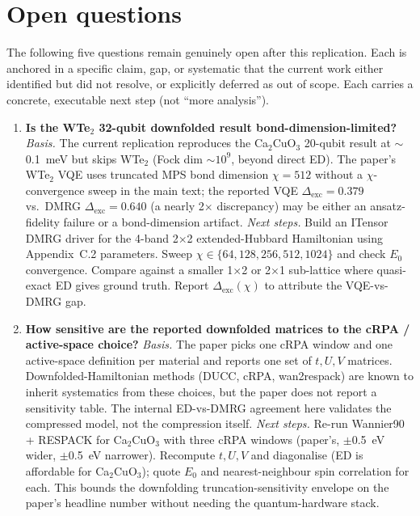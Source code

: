 \section{Open questions}

The following five questions remain genuinely open after this replication. Each is anchored in a specific claim, gap, or systematic that the current work either identified but did not resolve, or explicitly deferred as out of scope. Each carries a concrete, executable next step (not ``more analysis'').

\begin{enumerate}

\item \textbf{Is the WTe$_2$ 32-qubit downfolded result bond-dimension-limited?}
\emph{Basis.} The current replication reproduces the Ca$_2$CuO$_3$ 20-qubit result at $\sim$0.1~meV but skips WTe$_2$ (Fock dim $\sim 10^9$, beyond direct ED). The paper's WTe$_2$ VQE uses truncated MPS bond dimension $\chi=512$ without a $\chi$-convergence sweep in the main text; the reported VQE $\Delta_{\text{exc}} = 0.379$ vs.\ DMRG $\Delta_{\text{exc}}=0.640$ (a nearly 2$\times$ discrepancy) may be either an ansatz-fidelity failure or a bond-dimension artifact.
\emph{Next steps.} Build an ITensor DMRG driver for the 4-band 2$\times$2 extended-Hubbard Hamiltonian using Appendix~C.2 parameters. Sweep $\chi \in \{64, 128, 256, 512, 1024\}$ and check $E_0$ convergence. Compare against a smaller 1$\times$2 or 2$\times$1 sub-lattice where quasi-exact ED gives ground truth. Report $\Delta_{\text{exc}}(\chi)$ to attribute the VQE-vs-DMRG gap.

\item \textbf{How sensitive are the reported downfolded matrices to the cRPA / active-space choice?}
\emph{Basis.} The paper picks one cRPA window and one active-space definition per material and reports one set of $t, U, V$ matrices. Downfolded-Hamiltonian methods (DUCC, cRPA, wan2respack) are known to inherit systematics from these choices, but the paper does not report a sensitivity table. The internal ED-vs-DMRG agreement here validates the compressed model, not the compression itself.
\emph{Next steps.} Re-run Wannier90 + RESPACK for Ca$_2$CuO$_3$ with three cRPA windows (paper's, $\pm$0.5~eV wider, $\pm$0.5~eV narrower). Recompute $t, U, V$ and diagonalise (ED is affordable for Ca$_2$CuO$_3$); quote $E_0$ and nearest-neighbour spin correlation for each. This bounds the downfolding truncation-sensitivity envelope on the paper's headline number without needing the quantum-hardware stack.


\end{enumerate}
